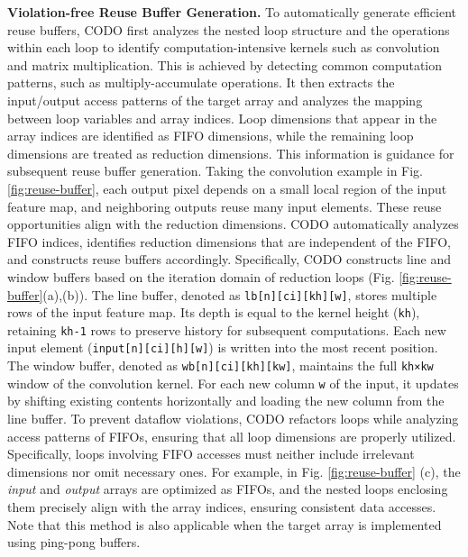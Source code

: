 \documentclass[conference]{IEEEtran}
\begin{document}
\textbf{Violation-free Reuse Buffer Generation.} 
To automatically generate efficient reuse buffers, 
CODO first analyzes the nested loop structure and the operations within each loop to identify computation-intensive kernels such as convolution and matrix multiplication. This is achieved by detecting common computation patterns, such as multiply-accumulate operations. It then extracts the input/output access patterns of the target array and analyzes the mapping between loop variables and array indices. Loop dimensions that appear in the array indices are identified as FIFO dimensions, while the remaining loop dimensions are treated as reduction dimensions. This information is guidance for subsequent reuse buffer generation.
Taking the convolution example in Fig. \ref{fig:reuse-buffer}, each output pixel depends on a small local region of the input feature map, and neighboring outputs reuse many input elements. These reuse opportunities align with the reduction dimensions. CODO automatically analyzes FIFO indices, identifies reduction dimensions that are independent of the FIFO, and constructs reuse buffers accordingly.
Specifically, CODO constructs line and window buffers based on the iteration domain of reduction loops (Fig. \ref{fig:reuse-buffer}(a),(b)).
The line buffer, denoted as \texttt{lb[n][ci][kh][w]}, stores multiple rows of the input feature map.
Its depth is equal to the kernel height (\texttt{kh}), retaining \texttt{kh-1} rows to preserve history for subsequent computations. Each new input element (\texttt{input[n][ci][h][w]}) is written into the most recent position. The window buffer, denoted as \texttt{wb[n][ci][kh][kw]}, maintains the full \texttt{kh×kw} window of the convolution kernel. For each new column \texttt{w} of the input, it updates by shifting existing contents horizontally and loading the new column from the line buffer. To prevent dataflow violations, CODO refactors loops while analyzing access patterns of FIFOs, ensuring that all loop dimensions are properly utilized. Specifically, loops involving FIFO accesses must neither include irrelevant dimensions nor omit necessary ones. For example, in Fig. \ref{fig:reuse-buffer} (c), the \textit{input} and \textit{output} arrays are optimized as FIFOs, and the nested loops enclosing them precisely align with the array indices, ensuring consistent data accesses. Note that this method is also applicable when the target array is implemented using ping-pong buffers.
\color{black}
\end{document}
